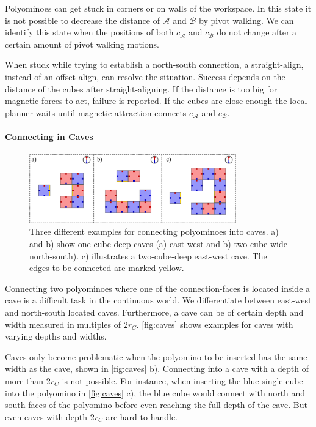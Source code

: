 Polyominoes can get stuck in corners or on walls of the workspace.
In this state it is not possible to decrease the distance of $\mathcal{A}$ and $\mathcal{B}$ by pivot walking.
We can identify this state when the positions  of both $c_\mathcal{A}$ and $c_\mathcal{B}$ do not change after a certain amount of pivot walking motions.

When stuck while trying to establish a north-south connection, a straight-align, instead of an offset-align, can resolve the situation.
Success depends on the distance of the cubes after straight-aligning.
If the distance is too big for magnetic forces to act, failure is reported.
If the cubes are close enough the local planner waits until magnetic attraction connects $e_\mathcal{A}$ and $e_\mathcal{B}$.


\paragraph{Connecting in Caves}

\begin{figure}
	\centering
	\includegraphics[width=0.80\textwidth]{figures/caves.pdf}
	\caption[Examples for connecting polyominoes into caves]{Three different examples for connecting polyominoes into caves. a) and b) show one-cube-deep caves (a) east-west and b) two-cube-wide north-south). c) illustrates a two-cube-deep east-west cave. The edges to be connected are marked yellow.}
	\label{fig:caves}
\end{figure}

Connecting two polyominoes where one of the connection-faces is located inside a cave is a difficult task in the continuous world.
We differentiate between east-west and north-south located caves.
Furthermore, a cave can be of certain depth and width measured in multiples of $2 r_C$.
\autoref{fig:caves} shows examples for caves with varying depths and widths.

Caves only become problematic when the polyomino to be inserted has the same width as the cave, shown in \autoref{fig:caves} b).
Connecting into a cave with a depth of more than $2 r_C$ is not possible.
For instance, when inserting the blue single cube into the polyomino in \autoref{fig:caves} c), the blue cube would connect with north and south faces of the polyomino before even reaching the full depth of the cave.
But even caves with depth $2 r_C$ are hard to handle.

